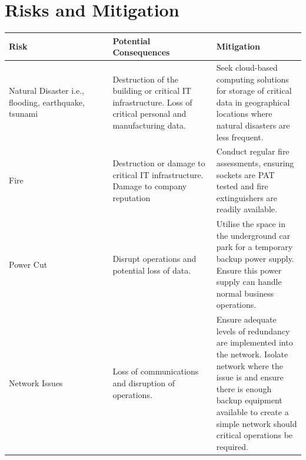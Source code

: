 \section{Risks and Mitigation}
\begin{table}[H]
    \centering
    \begin{tabular}{|p{0.35\linewidth}|p{0.35\linewidth}|p{0.35\linewidth}|}
    \hline
    Risk                                                 & Potential Consequences                                                                                       & Mitigation                                                                                                                                                                                                                         \\ \hline
    Natural Disaster i.e., flooding, earthquake, tsunami & Destruction of the building or critical IT infrastructure. Loss of critical personal and manufacturing data. & Seek cloud-based computing solutions for storage of critical data in geographical locations where natural disasters are less frequent.                                                                                             \\ \hline
    Fire                                                 & Destruction or damage to critical IT infrastructure. Damage to company reputation                            & Conduct regular fire assessments, ensuring sockets are PAT tested and fire extinguishers are readily available.                                                                                                                    \\ \hline
    Power Cut                                            & Disrupt operations and potential loss of data.                                                               & Utilise the space in the underground car park for a temporary backup power supply. Ensure this power supply can handle normal business operations.                                                                                 \\ \hline
    Network Issues                                       & Loss of communications and disruption of operations.                                                         & Ensure adequate levels of redundancy are implemented into the network. Isolate network where the issue is and ensure there is enough backup equipment available to create a simple network should critical operations be required. \\ \hline

\end{tabular}
\end{table}
